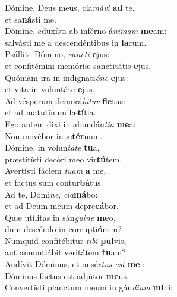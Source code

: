 \evenverse Dómine, Deus meus, cla\textit{má}\textit{vi} \textbf{ad} te,~\*\\
\evenverse et sa\textbf{ná}sti me.\\
\oddverse Dómine, eduxísti ab inférno á\textit{ni}\textit{mam} \textbf{me}am:~\*\\
\oddverse salvásti me a descendéntibus in \textbf{la}cum.\\
\evenverse Psállite Dómino, \textit{san}\textit{cti} \textbf{e}jus:~\*\\
\evenverse et confitémini memóriæ sanctitátis \textbf{e}jus.\\
\oddverse Quóniam ira in indignati\textit{ó}\textit{ne} \textbf{e}jus:~\*\\
\oddverse et vita in voluntáte \textbf{e}jus.\\
\evenverse Ad vésperum demorá\textit{bi}\textit{tur} \textbf{fle}tus:~\*\\
\evenverse et ad matutínum læ\textbf{tí}tia.\\
\oddverse Ego autem dixi in abundán\textit{ti}\textit{a} \textbf{me}a:~\*\\
\oddverse Non movébor in æ\textbf{tér}num.\\
\evenverse Dómine, in volun\textit{tá}\textit{te} \textbf{tu}a,~\*\\
\evenverse præstitísti decóri meo vir\textbf{tú}tem.\\
\oddverse Avertísti fáciem \textit{tu}\textit{am} \textbf{a} me,~\*\\
\oddverse et factus sum contur\textbf{bá}tus.\\
\evenverse Ad te, Dómi\textit{ne}, \textit{cla}\textbf{má}bo:~\*\\
\evenverse et ad Deum meum depre\textbf{cá}bor.\\
\oddverse Quæ utílitas in sán\textit{gui}\textit{ne} \textbf{me}o,~\*\\
\oddverse dum descéndo in corrupti\textbf{ó}nem?\\
\evenverse Numquid confitébitur \textit{ti}\textit{bi} \textbf{pul}vis,~\*\\
\evenverse aut annuntiábit veritátem \textbf{tu}am?\\
\oddverse Audívit Dóminus, et misér\textit{tus} \textit{est} \textbf{me}i:~\*\\
\oddverse Dóminus factus est adjútor \textbf{me}us.\\
\evenverse Convertísti planctum meum in gáu\textit{di}\textit{um} \textbf{mi}hi:~\*\\
